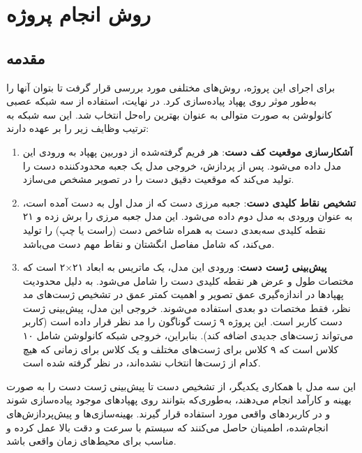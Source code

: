\chapter{روش انجام پروژه}
\section{مقدمه}
برای اجرای این پروژه، روش‌های مختلفی مورد بررسی قرار گرفت تا بتوان آنها را به‌طور موثر روی پهپاد پیاده‌سازی کرد. در نهایت، استفاده از سه شبکه عصبی کانولوشن به صورت متوالی به عنوان بهترین راه‌حل انتخاب شد. این سه شبکه به ترتیب وظایف زیر را بر عهده دارند:

\begin{enumerate}
    \item \textbf{آشکارسازی موقعیت کف دست}: هر فریم گرفته‌شده از دوربین پهپاد به ورودی این مدل داده می‌شود. پس از پردازش، خروجی مدل یک جعبه محدودکننده  دست را تولید می‌کند که موقعیت دقیق دست را در تصویر مشخص می‌سازد.
    
    \item \textbf{تشخیص نقاط کلیدی دست}: جعبه مرزی دست که از مدل اول به دست آمده است، به عنوان ورودی به مدل دوم داده می‌شود. این مدل جعبه مرزی را برش زده و ۲۱ نقطه کلیدی سه‌بعدی دست به همراه شاخص دست (راست یا چپ) را تولید می‌کند، که شامل مفاصل انگشتان و نقاط مهم دست می‌باشد.
    
    \item \textbf{پیش‌بینی ژست دست}: ورودی این مدل، یک ماتریس به ابعاد ۲۱×۲ است که مختصات طول و عرض هر نقطه کلیدی دست را شامل می‌شود. به دلیل محدودیت پهپادها در اندازه‌گیری عمق تصویر و اهمیت کمتر عمق در تشخیص ژست‌های مد نظر، فقط مختصات دو بعدی استفاده می‌شوند. خروجی این مدل، پیش‌بینی ژست دست کاربر است. این پروژه ۹ ژست گوناگون را مد نظر قرار داده است (کاربر می‌تواند ژست‌های جدیدی اضافه کند). بنابراین، خروجی شبکه کانولوشن شامل ۱۰ کلاس است که ۹ کلاس برای ژست‌های مختلف و یک کلاس برای زمانی که هیچ کدام از ژست‌ها انتخاب نشده‌اند، در نظر گرفته شده است.
\end{enumerate}

این سه مدل با همکاری یکدیگر، از تشخیص دست تا پیش‌بینی ژست دست را به صورت بهینه و کارآمد انجام می‌دهند، به‌طوری‌که بتوانند روی پهپادهای موجود پیاده‌سازی شوند و در کاربردهای واقعی مورد استفاده قرار گیرند. بهینه‌سازی‌ها و پیش‌پردازش‌های انجام‌شده، اطمینان حاصل می‌کنند که سیستم با سرعت و دقت بالا عمل کرده و مناسب برای محیط‌های زمان واقعی باشد.


